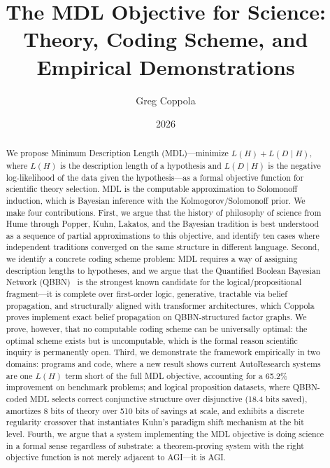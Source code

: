 \documentclass[11pt]{article}
\title{The MDL Objective for Science:\\
Theory, Coding Scheme, and Empirical Demonstrations}
\author{Greg Coppola}
\date{2026}
\begin{document}
\maketitle

\begin{abstract}
We propose Minimum Description Length (MDL)---minimize $L(H) + L(D \mid H)$, where $L(H)$ is the description length of a hypothesis and $L(D \mid H)$ is the negative log-likelihood of the data given the hypothesis---as a formal objective function for scientific theory selection. MDL is the computable approximation to Solomonoff induction, which is Bayesian inference with the Kolmogorov/Solomonoff prior. We make four contributions. First, we argue that the history of philosophy of science from Hume through Popper, Kuhn, Lakatos, and the Bayesian tradition is best understood as a sequence of partial approximations to this objective, and identify ten cases where independent traditions converged on the same structure in different language. Second, we identify a concrete coding scheme problem: MDL requires a way of assigning description lengths to hypotheses, and we argue that the Quantified Boolean Bayesian Network (QBBN)~\cite{coppola2024qbbn} is the strongest known candidate for the logical/propositional fragment---it is complete over first-order logic, generative, tractable via belief propagation, and structurally aligned with transformer architectures, which Coppola~\cite{coppola2026} proves implement exact belief propagation on QBBN-structured factor graphs. We prove, however, that no computable coding scheme can be universally optimal: the optimal scheme exists but is uncomputable, which is the formal reason scientific inquiry is permanently open. Third, we demonstrate the framework empirically in two domains: programs and code, where a new result shows current AutoResearch systems are one $L(H)$ term short of the full MDL objective, accounting for a 65.2\% improvement on benchmark problems; and logical proposition datasets, where QBBN-coded MDL selects correct conjunctive structure over disjunctive (18.4 bits saved), amortizes 8 bits of theory over 510 bits of savings at scale, and exhibits a discrete regularity crossover that instantiates Kuhn's paradigm shift mechanism at the bit level. Fourth, we argue that a system implementing the MDL objective is doing science in a formal sense regardless of substrate: a theorem-proving system with the right objective function is not merely adjacent to AGI---it is AGI.
\end{abstract}

\tableofcontents
\newpage















\end{document}
